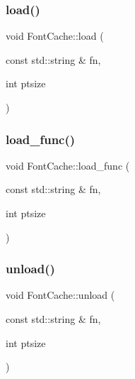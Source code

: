 \mbox{\label{classsage_1_1FontCache_a2221e34a4ddd51266f374b727baac79e}} 
\subsubsection{\texorpdfstring{load()}{load()}}
{\footnotesize\ttfamily void Font\+Cache\+::load (\begin{DoxyParamCaption}\item[{const std\+::string \&}]{fn,  }\item[{int}]{ptsize }\end{DoxyParamCaption})}

\mbox{\label{classsage_1_1FontCache_a9792b2e9a7db90b2c44a9ebfd8fe9067}} 
\subsubsection{\texorpdfstring{load\_func()}{load\_func()}}
{\footnotesize\ttfamily void Font\+Cache\+::load\+\_\+func (\begin{DoxyParamCaption}\item[{const std\+::string \&}]{fn,  }\item[{int}]{ptsize }\end{DoxyParamCaption})\hspace{0.3cm}{\ttfamily [private]}}

\mbox{\label{classsage_1_1FontCache_a0d4b71fedf081cb72eab09dc53ea251f}} 
\subsubsection{\texorpdfstring{unload()}{unload()}\hspace{0.1cm}{\footnotesize\ttfamily [1/2]}}
{\footnotesize\ttfamily void Font\+Cache\+::unload (\begin{DoxyParamCaption}\item[{const std\+::string \&}]{fn,  }\item[{int}]{ptsize }\end{DoxyParamCaption})}

